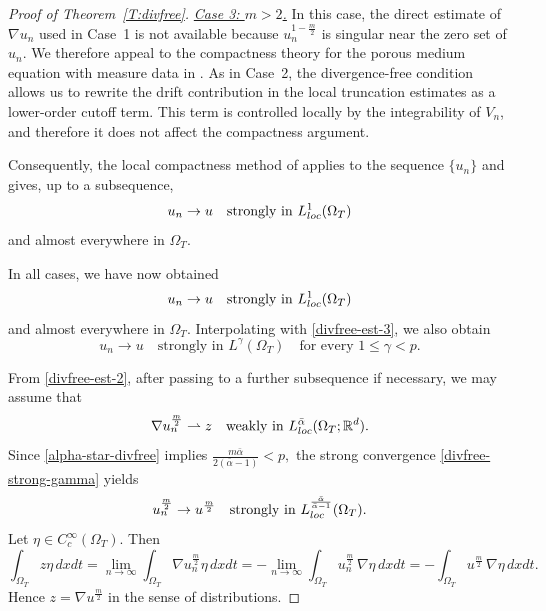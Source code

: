 \documentclass{amsart}
\numberwithin{equation}{section}
\begin{document}
\begin{proof}[Proof of Theorem~\ref{T:divfree}]
\smallskip
\noindent
\underline{\emph{Case 3: $m>2$.}}
In this case, the direct estimate of $\nabla u_n$ used in Case~1 is not
available because $u_n^{1-\frac m2}$ is singular near the zero set of
$u_n$. We therefore appeal to the compactness theory for the porous medium
equation with measure data in \cite{BDG13}. As in Case~2, the
divergence-free condition allows us to rewrite the drift contribution in
the local truncation estimates as a lower-order cutoff term. This term is
controlled locally by the integrability of $V_n$, and therefore it does not
affect the compactness argument.

Consequently, the local compactness method of \cite{BDG13} applies to the
sequence $\{u_n\}$ and gives, up to a subsequence,
\[
u_n\to u
\quad \text{strongly in }L^1_{\rm loc}(\Omega_T)
\]
and almost everywhere in $\Omega_T$.

\smallskip

In all cases, we have now obtained
\[
u_n\to u
\quad \text{strongly in }L^1_{\rm loc}(\Omega_T)
\]
and almost everywhere in $\Omega_T$.
Interpolating with \eqref{divfree-est-3}, we also obtain
\begin{equation}\label{divfree-strong-gamma}
u_n\to u
\quad \text{strongly in }L^\gamma(\Omega_T)
\quad \text{for every }1\le \gamma<p.
\end{equation}


From \eqref{divfree-est-2}, after passing to a further subsequence if necessary, we may assume that
\[
\nabla u_n^{\frac m2}\rightharpoonup z
\quad \text{weakly in }L^{\bar\alpha}_{\rm loc}(\Omega_T;\mathbb R^d).
\]
Since \eqref{alpha-star-divfree} implies
\(
\frac{m\bar\alpha}{2(\bar\alpha-1)}<p,
\)
the strong convergence \eqref{divfree-strong-gamma} yields
\[
u_n^{\frac m2}\to u^{\frac m2}
\quad \text{strongly in }L^{\frac{\bar\alpha}{\bar\alpha-1}}_{\rm loc}(\Omega_T).
\]
Let $\eta\in C_c^\infty(\Omega_T)$. Then
\[
\int_{\Omega_T} z\eta\,dxdt
=
\lim_{n\to\infty}\int_{\Omega_T}\nabla u_n^{\frac m2}\eta\,dxdt
=
-\lim_{n\to\infty}\int_{\Omega_T}u_n^{\frac m2}\,\nabla\eta\,dxdt
=
-\int_{\Omega_T}u^{\frac m2}\,\nabla\eta\,dxdt.
\]
Hence $z=\nabla u^{\frac m2}$ in the sense of distributions.





\end{proof}
\end{document}
